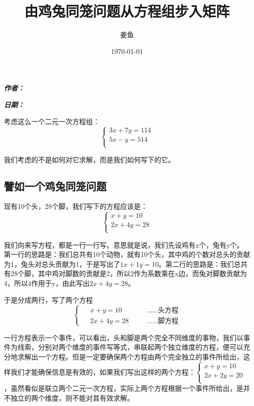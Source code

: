 \documentclass[fontset=none]{ctexart}
\makeatletter
\renewcommand{\maketitle}{
  \begin{flushleft} %
    {\huge\bfseries \@title \par} %
    \vspace{0.5em}
    {\large \bfseries \textit{作者：} \@author \par} %
    \vspace{0.5em}
    {\large\bfseries \textit{日期：}\@date}%
  \end{flushleft}
  \thispagestyle{empty} %
  \vspace{1cm} %
}
\makeatother
\begin{document}
\title{由鸡兔同笼问题从方程组步入矩阵}
\author{姜鱼}
\date{\today}
\maketitle
\renewcommand{\thesubsection}{\arabic{subsection}} %
\songti

考虑这么一个二元一次方程组：$$
\begin{cases}
	3x+7y=114\\
	5x-y=514\\
\end{cases}
$$  

我们考虑的不是如何对它求解，而是我们如何写下的它。

\subsection{譬如一个鸡兔同笼问题}
现有10个头，28个脚，我们写下的方程应该是：$$\begin{cases}
	x+y=10\\
	2x+4y=28\\
\end{cases}$$

我们向来写方程，都是一行一行写。意思就是说，我们先设鸡有x个，兔有y个。第一行的思路是：我们总共有10个动物，就有10个头，其中鸡的个数对总头的贡献为1，兔头对总头贡献为1，于是写出了$1x+1y=10$。第二行的思路是：我们总共有28个脚，其中鸡对脚数的贡献是2，所以2作为系数乘在x边，而兔对脚数贡献为4，所以4作用于y，由此写出$2x+4y=28$。

于是分成两行，写了两个方程\begin{equation*}
  \left\{
  \begin{aligned}
      &\ \ x + y = 10 \quad && \text{……头方程} \\
      &\ \ 2x + 4y = 28 \quad && \text{……脚方程}
  \end{aligned}
  \right.
\end{equation*}

一行方程表示一个事件，可以看出，头和脚是两个完全不同维度的事物，我们以事件为线索，分别对两个维度的事件写等式，串联起两个独立维度的方程，便可以充分地求解出一个方程。但是一定要确保两个方程由两个完全独立的事件所给出，这样我们才能确保信息是有效的，如果我们写出这样的两个方程：$\begin{cases}
	x+y=10\\
	2x+2y=20\\
\end{cases}$，虽然看似是联立两个二元一次方程，实际上两个方程根据一个事件所给出，是并不独立的两个维度，则不能对其有效求解。
\end{document}
